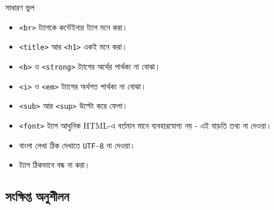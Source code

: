 \begin{mistakebox}{সাধারণ ভুল}
\par\noindent
\begin{minipage}[t]{.48\linewidth}\vspace{0pt}
\begin{itemize}
\item \texttt{<br>} ট্যাগকে কন্টেইনার ট্যাগ মনে করা।
\item \texttt{<title>} আর \texttt{<h1>} একই মনে করা।
\item \texttt{<b>} ও \texttt{<strong>} ট্যাগের অর্থের পার্থক্য না বোঝা।
\item \texttt{<i>} ও \texttt{<em>} ট্যাগের অর্থগত পার্থক্য না বোঝা।
\end{itemize}
\end{minipage}\hfill
\begin{minipage}[t]{.48\linewidth}\vspace{0pt}
\begin{itemize}
\item \texttt{<sub>} আর \texttt{<sup>} উল্টো করে ফেলা।
\item \texttt{<font>} ট্যাগ আধুনিক HTML-এ বর্তমান মানে ব্যবহারযোগ্য নয় - এই বাড়তি তথ্য না দেওয়া।
\item বাংলা লেখা ঠিক দেখাতে \texttt{UTF-8} না দেওয়া।
\item ট্যাগ ঠিকভাবে বন্ধ না করা।
\end{itemize}
\end{minipage}\par

\end{mistakebox}




\subsection{সংক্ষিপ্ত অনুশীলন}

